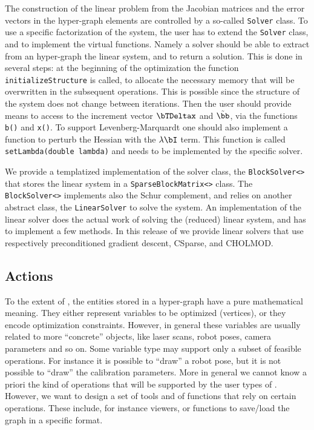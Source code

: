 \documentclass[a4paper]{article}
\begin{document}
The construction of the linear problem from the Jacobian matrices and the error vectors
in the hyper-graph elements are controlled by a so-called \verb+Solver+ class.
To use a specific factorization of the system, the user has to extend the
\verb+Solver+ class, and to implement the virtual functions.
Namely a solver should be able to extract from an
hyper-graph the linear system, and to return a solution.  This is
done in several steps: at the beginning of the optimization the
function \verb+initializeStructure+ is called, to allocate the
necessary memory that will be overwritten in the subsequent
operations. This is possible since the structure of the system does
not change between iterations. Then the user should provide means to
access to the increment vector $\bTDeltax$ and $\tilde \bb$, via the
functions \verb+b()+ and \verb+x()+. To support Levenberg-Marquardt
one should also implement a function to perturb the Hessian with the
$\lambda \bI$ term. This function is called
\verb+setLambda(double lambda)+ and needs to be implemented by the
specific solver.

We provide a templatized implementation of the solver class, the
\verb+BlockSolver<>+ that stores the linear system in a
\verb+SparseBlockMatrix<>+ class. The \verb+BlockSolver<>+ implements
also the Schur complement, and relies on another abstract class, the
\verb+LinearSolver+ to solve the system.
An implementation of the linear solver does the actual work
of solving the (reduced) linear system, and has to implement a few methods.
In this release of \gopt{} we provide linear solvers that use respectively
preconditioned gradient descent, CSparse, and CHOLMOD.


\subsection{Actions}
To the extent of \gopt{}, the entities stored in a hyper-graph have a
pure mathematical meaning. They either represent variables to be
optimized (vertices), or they encode optimization constraints.
However, in general these variables are usually related to more
``concrete'' objects, like laser scans, robot poses, camera parameters
and so on.  Some variable type may support only a subset of feasible
operations.  For instance it is possible to ``draw'' a robot pose, but
it is not possible to ``draw'' the calibration parameters.  More in
general we cannot know a priori the kind of operations that will be
supported by the user types of \gopt.  However, we want to design a set
of tools and of functions that rely on certain operations. These include,
for instance viewers, or functions to save/load the graph in a specific format.
\end{document}
